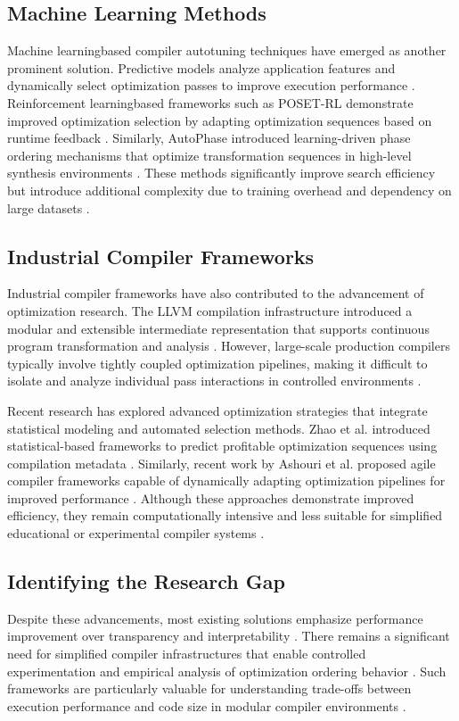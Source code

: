 \documentclass[conference]{IEEEtran}
\begin{document}
\subsection{Machine Learning Methods}
Machine learning\textendash based compiler autotuning techniques have emerged as another prominent solution. Predictive models analyze application features and dynamically select optimization passes to improve execution performance \cite{ref8}. Reinforcement learning\textendash based frameworks such as POSET-RL demonstrate improved optimization selection by adapting optimization sequences based on runtime feedback \cite{ref8}. Similarly, AutoPhase introduced learning-driven phase ordering mechanisms that optimize transformation sequences in high-level synthesis environments \cite{ref12}. These methods significantly improve search efficiency but introduce additional complexity due to training overhead and dependency on large datasets \cite{ref12}.

\subsection{Industrial Compiler Frameworks}
Industrial compiler frameworks have also contributed to the advancement of optimization research. The LLVM compilation infrastructure introduced a modular and extensible intermediate representation that supports continuous program transformation and analysis \cite{ref16}. However, large-scale production compilers typically involve tightly coupled optimization pipelines, making it difficult to isolate and analyze individual pass interactions in controlled environments \cite{ref16}.

Recent research has explored advanced optimization strategies that integrate statistical modeling and automated selection methods. Zhao et al. introduced statistical-based frameworks to predict profitable optimization sequences using compilation metadata \cite{ref7}. Similarly, recent work by Ashouri et al. proposed agile compiler frameworks capable of dynamically adapting optimization pipelines for improved performance \cite{ref27}. Although these approaches demonstrate improved efficiency, they remain computationally intensive and less suitable for simplified educational or experimental compiler systems \cite{ref27}.

\subsection{Identifying the Research Gap}
Despite these advancements, most existing solutions emphasize performance improvement over transparency and interpretability \cite{ref2}. There remains a significant need for simplified compiler infrastructures that enable controlled experimentation and empirical analysis of optimization ordering behavior \cite{ref1}. Such frameworks are particularly valuable for understanding trade-offs between execution performance and code size in modular compiler environments \cite{ref19}.
\end{document}
